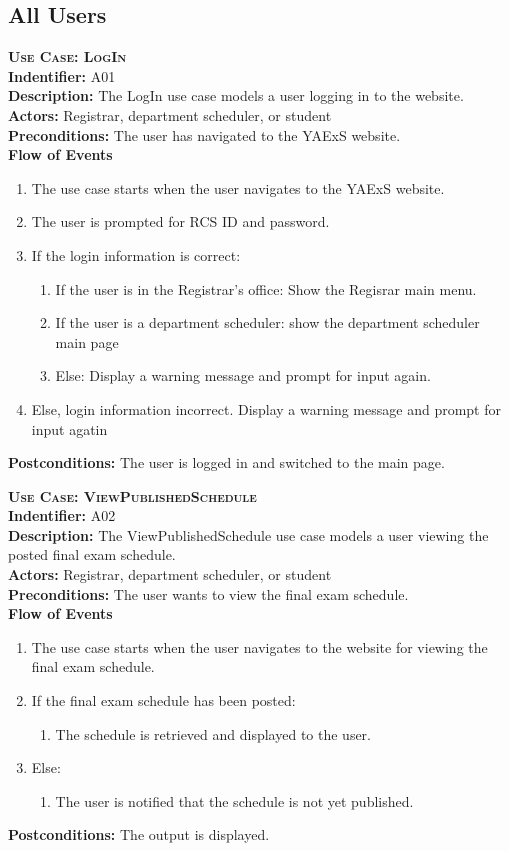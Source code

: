 \documentclass[11pt]{article}
\newenvironment{usecase}{%
	\def\title##1{ {\large \bfseries  \scshape {Use Case:} ##1} \\ }
 	\def\id##1{{\bf Indentifier:} ##1\\}
	\def\des##1{ {\bf Description:} ##1\\}
	\def\actors##1{ {\bf Actors:} ##1\\}
    	\def\pre##1{ {\bf Preconditions:} ##1 \\} %
    	\def\flow##1{ {\bf Flow of Events} ##1}%
    	\newenvironment{ucenum}{%
        	\begin{enumerate}[nolistsep]\small}%
        	{\end{enumerate}}
	\def\post##1{ {\bf Postconditions:} ##1 \\}
}{\vspace{.05in}}
\begin{document}
\subsection{All Users}
\begin{usecase}
  \title{LogIn}
  \id{A01}
  \des{The LogIn use case models a user logging in to the website.}
  \actors{Registrar, department scheduler, or student}
  \pre{The user has navigated to the YAExS website.}
  \flow{}
  \begin{ucenum}
  \item The use case starts when the user navigates to the YAExS website.
  \item The user is prompted for RCS ID and password.
  \item If the login information is correct:
    \begin{ucenum}
    \item If the user is in the Registrar's office: Show the Regisrar main menu.
    \item If the user is a department scheduler: show the department scheduler main page
    \item Else: Display a warning message and prompt for input again.
    \end{ucenum}
  \item Else, login information incorrect. Display a warning message and prompt for input agatin
  \end{ucenum}
  \post{The user is logged in and switched to the main page.}
\end{usecase}

\begin{usecase}
  \title{ViewPublishedSchedule}
  \id{A02}
  \des{The ViewPublishedSchedule use case models a user viewing the posted final exam schedule.}
  \actors{Registrar, department scheduler, or student}
  \pre{The user wants to view the final exam schedule.}
  \flow{}
  \begin{ucenum}
  \item The use case starts when the user navigates to the website for viewing the final exam schedule.
  \item If the final exam schedule has been posted:
    \begin{ucenum} \item The schedule is retrieved and displayed to the user. \end{ucenum}
  \item Else:
    \begin{ucenum} \item The user is notified that the schedule is not yet published. \end{ucenum}
  \end{ucenum}
  \post{The output is displayed.}
\end{usecase}
\end{document}
